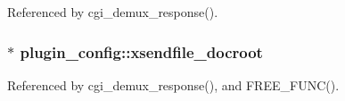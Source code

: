 Referenced by cgi\-\_\-demux\-\_\-response().

\hypertarget{structplugin__config_ab04d89b85e2ebf153d90248808df4640}{
\subsubsection[{xsendfile\-\_\-docroot}]{$\ast$ plugin\-\_\-config\-::xsendfile\-\_\-docroot}}\label{structplugin__config_ab04d89b85e2ebf153d90248808df4640}


Referenced by cgi\-\_\-demux\-\_\-response(), and F\-R\-E\-E\-\_\-\-F\-U\-N\-C().



